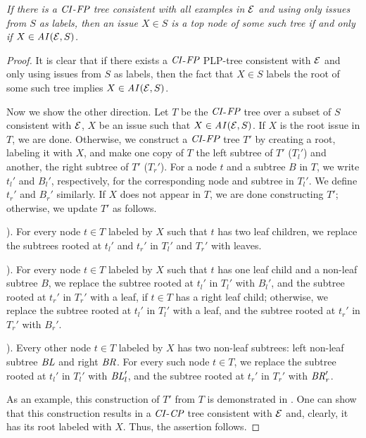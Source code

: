 \begin{prop}
\label{prop:2}
{\it If there is a $\textit{CI}$-$\textit{FP}$ tree consistent with all examples in $\mathcal{E}$ and 
using only issues from $S$ as labels, then an issue $X\in S$ is a top node
of some such tree if and only if $X\in \mathit{AI}(\mathcal{E},S)$.}
\end{prop}
\begin{proof}
	It is clear that if there exists a $\textit{CI}$-$\textit{FP}$ PLP-tree consistent with $\mathcal{E}$
	and only using issues from $S$ as labels, then the fact that
	$X \in S$ labels the root of some such tree implies $X \in \mathit{AI}(\mathcal{E},S)$.

	Now we show the other direction.
	Let $T$ be the $\textit{CI}$-$\textit{FP}$ tree over a subset of $S$ consistent 
	with $\mathcal{E}$,
	$X$ be an issue such that $X \in \mathit{AI}(\mathcal{E},S)$.
	If $X$ is the root issue in $T$, we are done.
	Otherwise, we construct a $\textit{CI}$-$\textit{FP}$ tree $T'$ by creating a root, 
	labeling it with $X$, and make one copy of $T$ the left subtree of $T'$
        ($T_l'$) and another, the right subtree of $T'$ ($T_r'$).
	For a node $t$ and a subtree $B$ in $T$, we write $t_l'$ and $B_l'$, 
	respectively, for the corresponding node and subtree in $T_l'$.
	We define $t_r'$ and $B_r'$ similarly. If $X$ does not appear in 
	$T$, we are done constructing $T'$; otherwise, we update $T'$ as 
	follows.

	). For every node $t\in T$ labeled by $X$ such that $t$ has two leaf children,
	we replace the subtrees rooted at $t_l'$ and $t_r'$ in $T_l'$ and $T_r'$ with leaves.

	). For every node $t \in T$ labeled by $X$ such that $t$ has one leaf child
	and a non-leaf subtree $B$, we replace the subtree rooted at $t_l'$ in $T_l'$ with $B_l'$,
	and the subtree rooted at $t_r'$ in $T_r'$ with a leaf,
	if $t \in T$ has a right leaf child; otherwise, we replace the subtree rooted at
	$t_l'$ in $T_l'$ with a leaf, and the subtree rooted at $t_r'$ in $T_r'$ with $B_r'$.

	). Every other node $t \in T$ labeled by $X$ has two non-leaf subtrees:
	left non-leaf subtree $\mathit{BL}$ and right $\mathit{BR}$.
	For every such node $t \in T$, we replace the subtree rooted at $t_l'$ in $T_l'$ with
	$\mathit{BL}_l'$, and the subtree rooted at $t_r'$ in $T_r'$ with $\mathit{BR}_r'$.

	As an example, this construction of $T'$ from $T$ is demonstrated in .
	One can show that this construction results in a $\textit{CI}$-$\textit{CP}$ tree consistent
	with $\mathcal{E}$ and, clearly, it has its root labeled with $X$.
	Thus, the assertion follows.
\end{proof}

